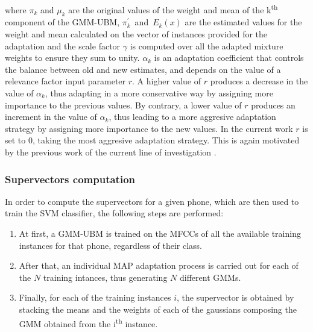 where $\pi_{k}$ and $\mu_{k}$ are the original values of the weight and mean of the
k\textsuperscript{th} component of the GMM-UBM, \mbox{$\pi_{k}^{'}$ and $E_{k}(x)$} are
the estimated values for the weight and mean calculated on the vector of instances provided
for the adaptation and the scale factor $\gamma$ is computed over all the
adapted mixture weights to ensure they sum to unity. $\alpha_{k}$ is an adaptation
coefficient that controls the balance between old and new estimates, and depends on the value of
a relevance factor input parameter $r$. A higher value of $r$ produces a decrease in the value
of $\alpha_{k}$, thus adapting in a more conservative way by assigning more importance
to the previous values. By contrary, a lower value of $r$ produces an increment in the value
of $\alpha_{k}$, thus leading to a more aggresive adaptation strategy by assigning more importance
to the new values. In the current work $r$ is set to 0, taking the most aggresive
adaptation strategy. This is again motivated by the previous work of the current
line of investigation \cite{main}.


\subsubsection{Supervectors computation}

In order to compute the supervectors for a given phone, which are then used to train the SVM
classifier, the following steps are performed:

\begin{enumerate}
  \item At first, a GMM-UBM is trained on the MFCCs
  of all the available training instances for that phone, regardless of their class.
  \item After that, an individual MAP adaptation process is carried out for each
  of the $N$ training intances, thus generating $N$ different GMMs.
  \item Finally, for each of the training instances $i$, the supervector is obtained by stacking
  the means and the weights of each of the gaussians composing the GMM obtained from the
  i\textsuperscript{th} instance.
\end{enumerate}

